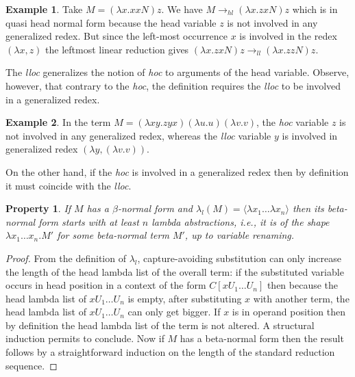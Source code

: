 \documentclass{elsarticle}
\makeatletter
\theoremstyle{plain}
\newtheorem{property}[theorem]{Property}
\theoremstyle{definition}
\newtheorem{example}{Example}[section]
\theoremstyle{remark}
\renewcommand\ie{{\it i.e.\@\xspace}}
\newcommand{\hlred}{\rightarrow_{hl}}
\newcommand{\llred}{\rightarrow_{ll}}
\makeatother
\begin{document}
\begin{example}
Take $M = (\lambda x. x x N) z$. We have $M \hlred (\lambda x. z x N) z$ which is in quasi head normal form because the head variable $z$ is not involved in any generalized redex.
But since the left-most occurrence $x$ is involved in the redex $(\lambda x, z)$ the leftmost linear reduction gives $(\lambda x. z x N) z \llred (\lambda x. z z N) z$.
\end{example}

The \emph{lloc} generalizes the notion of \emph{hoc} to arguments of the head variable. Observe, however, that contrary to the \emph{hoc}, the definition requires the \emph{lloc} to be involved in a generalized redex.
\begin{example}In the term $M = (\lambda x y . z y x) (\lambda u . u) (\lambda v . v)$, the \emph{hoc} variable $z$ is not involved in any generalized redex, whereas the \emph{lloc} variable $y$ is involved in generalized redex $(\lambda y, (\lambda v.v))$.
\end{example}
On the other hand, if the \emph{hoc} is involved in a generalized redex then by definition it must coincide with the \emph{lloc}.

\begin{property}
If $M$ has a $\beta$-normal form and $\lambda_l(M) = \langle \lambda x_1 \ldots \lambda x_n \rangle$ then its beta-normal form starts with at least $n$ lambda abstractions, \ie, it is of the shape $\lambda x_1 \ldots x_n . M'$ for some beta-normal term $M'$, up to variable renaming.
\end{property}
\begin{proof}
From the definition of $\lambda_l$, capture-avoiding substitution can only increase the length of the head lambda list of the overall term: if the substituted variable occurs in head position in a context of the form $C[x U_1 \ldots U_n]$ then because the head lambda list of $x U_1 \ldots U_n$ is empty, after substituting $x$ with another term, the head lambda list of $x U_1 \ldots U_n$ can only get bigger. If $x$ is in operand position then by definition the head lambda list of the term is not altered. A structural induction permits to conclude.
Now if $M$ has a beta-normal form then the result follows by a straightforward induction on the length of the standard reduction sequence.
\end{proof}
\end{document}
